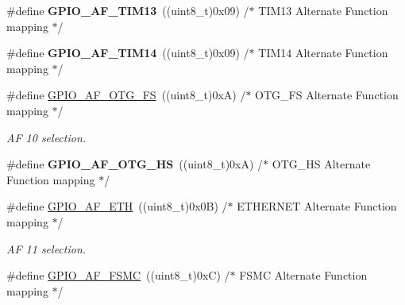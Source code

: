 \begin{DoxyCompactItemize}
\item 
\#define {\bfseries G\+P\+I\+O\+\_\+\+A\+F\+\_\+\+T\+I\+M13}~((uint8\+\_\+t)0x09)  /$\ast$ T\+I\+M13 Alternate Function mapping $\ast$/\hypertarget{group___g_p_i_o___alternat__function__selection__define_gae89e027f14289052d5c51b4c96f79702}{}\label{group___g_p_i_o___alternat__function__selection__define_gae89e027f14289052d5c51b4c96f79702}

\item 
\#define {\bfseries G\+P\+I\+O\+\_\+\+A\+F\+\_\+\+T\+I\+M14}~((uint8\+\_\+t)0x09)  /$\ast$ T\+I\+M14 Alternate Function mapping $\ast$/\hypertarget{group___g_p_i_o___alternat__function__selection__define_ga9341da4e7ba3921ed1a683df3ec0e41b}{}\label{group___g_p_i_o___alternat__function__selection__define_ga9341da4e7ba3921ed1a683df3ec0e41b}

\item 
\#define \hyperlink{group___g_p_i_o___alternat__function__selection__define_gaeba0aeefec841e505170efc7762ae588}{G\+P\+I\+O\+\_\+\+A\+F\+\_\+\+O\+T\+G\+\_\+\+FS}~((uint8\+\_\+t)0x\+A)  /$\ast$ O\+T\+G\+\_\+\+F\+S Alternate Function mapping $\ast$/\hypertarget{group___g_p_i_o___alternat__function__selection__define_gaeba0aeefec841e505170efc7762ae588}{}\label{group___g_p_i_o___alternat__function__selection__define_gaeba0aeefec841e505170efc7762ae588}

\begin{DoxyCompactList}\small\item\em AF 10 selection. \end{DoxyCompactList}\item 
\#define {\bfseries G\+P\+I\+O\+\_\+\+A\+F\+\_\+\+O\+T\+G\+\_\+\+HS}~((uint8\+\_\+t)0x\+A)  /$\ast$ O\+T\+G\+\_\+\+H\+S Alternate Function mapping $\ast$/\hypertarget{group___g_p_i_o___alternat__function__selection__define_gaa92d928ec3d83bfef06877092178960a}{}\label{group___g_p_i_o___alternat__function__selection__define_gaa92d928ec3d83bfef06877092178960a}

\item 
\#define \hyperlink{group___g_p_i_o___alternat__function__selection__define_ga26cf3f30fe5154bd461b27fab58e45e2}{G\+P\+I\+O\+\_\+\+A\+F\+\_\+\+E\+TH}~((uint8\+\_\+t)0x0\+B)  /$\ast$ E\+T\+H\+E\+R\+N\+E\+T Alternate Function mapping $\ast$/\hypertarget{group___g_p_i_o___alternat__function__selection__define_ga26cf3f30fe5154bd461b27fab58e45e2}{}\label{group___g_p_i_o___alternat__function__selection__define_ga26cf3f30fe5154bd461b27fab58e45e2}

\begin{DoxyCompactList}\small\item\em AF 11 selection. \end{DoxyCompactList}\item 
\#define \hyperlink{group___g_p_i_o___alternat__function__selection__define_ga8378a89ae1a16d5ae5d315ca49a57674}{G\+P\+I\+O\+\_\+\+A\+F\+\_\+\+F\+S\+MC}~((uint8\+\_\+t)0x\+C)  /$\ast$ F\+S\+M\+C Alternate Function mapping $\ast$/\hypertarget{group___g_p_i_o___alternat__function__selection__define_ga8378a89ae1a16d5ae5d315ca49a57674}{}\label{group___g_p_i_o___alternat__function__selection__define_ga8378a89ae1a16d5ae5d315ca49a57674}


\end{DoxyCompactItemize}
